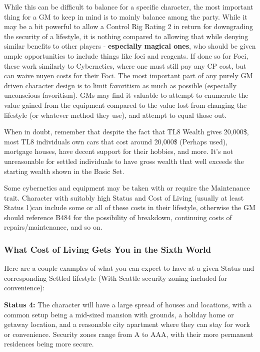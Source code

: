 \begin{multicols*}{2}
	While this can be difficult to balance for a specific character, the most important thing for a GM to keep in mind is to mainly balance among the party. While it may be a bit powerful to allow a Control Rig Rating 2 in return for downgrading the security of a lifestyle, it is nothing compared to allowing that while denying similar benefits to other players - \textbf{especially magical ones}, who should be given ample opportunities to include things like foci and reagents. If done so for Foci, these work similarly to Cybernetics, where one must still pay any CP cost, but can waive nuyen costs for their Foci. The most important part of any purely GM driven character design is to limit favoritism as much as possible (especially unconscious favoritism). GMs may find it valuable to attempt to enumerate the value gained from the equipment compared to the value lost from changing the lifestyle (or whatever method they use), and attempt to equal those out.
	
	When in doubt, remember that despite the fact that TL8 Wealth gives 20,000\$, most TL8 individuals own cars that cost around 20,000\$ (Perhaps used), mortgage houses, have decent support for their hobbies, and more. It's not unreasonable for settled individuals to have gross wealth that well exceeds the starting wealth shown in the Basic Set.
	
	Some cybernetics and equipment may be taken with or require the Maintenance trait. Character with suitably high Status and Cost of Living (usually at least Status 1)can include some or all of these costs in their lifestyle, otherwise the GM should reference B484 for the possibility of breakdown, continuing costs of repairs/maintenance, and so on.
	
	\subsubsection*{What Cost of Living Gets You in the Sixth World}
	
	Here are a couple examples of what you can expect to have at a given Status and corresponding Settled lifestyle (With Seattle security zoning included for convenience):
	
	\textbf{Status 4:} The character will have a large spread of houses and locations, with a common setup being a mid-sized mansion with grounds, a holiday home or getaway location, and a reasonable city apartment where they can stay for work or convenience. Security zones range from A to AAA, with their more permanent residences being more secure. 
	

\end{multicols*}
